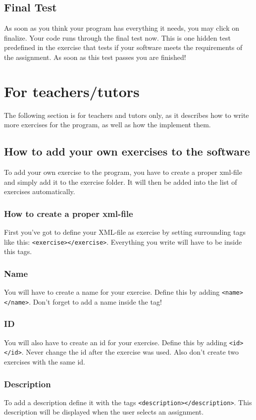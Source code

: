 \documentclass[10pt,a4paper]{article}
\begin{document}
\subsection{Final Test}
As soon as you think your program has everything it needs, you may click on finalize. Your code runs through the final test now. This is one hidden test predefined in the exercise that tests if your software meets the requirements of the assignment. As soon as this test passes you are finished!
\section{For teachers/tutors}
The following section is for teachers and tutors only, as it describes how to write more exercises for the program, as well as how the implement them.
\subsection{How to add your own exercises to the software}
To add your own exercise to the program, you have to create a proper xml-file and simply add it to the exercise folder. It will then be added into the list of exercises automatically.
\subsubsection{How to create a proper xml-file}
First you've got to define your XML-file as exercise by setting surrounding tags like this: 
\texttt{<exercise></exercise>}. Everything you write will have to be inside this tags.
\subsubsection{Name}
You will have to create a name for your exercise. Define this by adding \texttt{<name></name>}. Don't forget to add a name inside the tag!
\subsubsection{ID}
You will also have to create an id for your exercise. Define this by adding \texttt{<id></id>}. Never change the id  after the exercise was used. Also don't create two exercises with the same id.
\subsubsection{Description}
To add a description define it with the tags \texttt{<description></description>}. This description will be displayed when the user selects an assignment.
\end{document}
